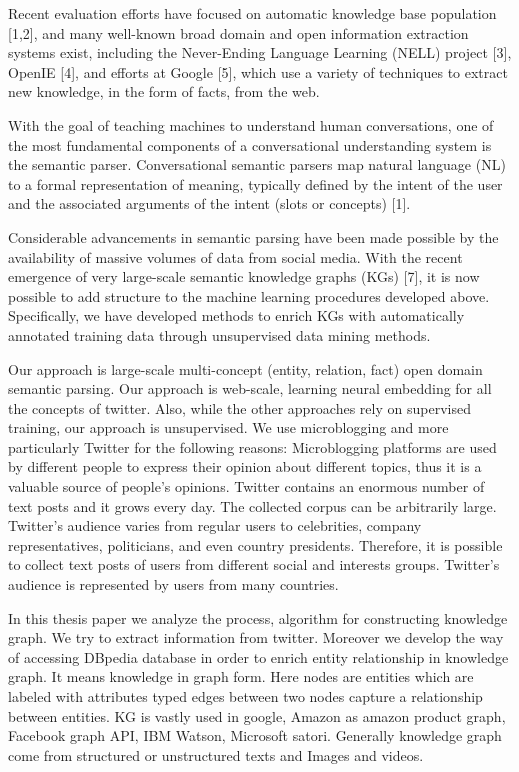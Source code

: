  Recent evaluation efforts have focused on automatic knowledge base population [1,2], and many well-known broad domain and open information extraction systems exist, including the Never-Ending Language Learning (NELL) project [3], OpenIE [4], and efforts at Google [5], which use a variety of techniques to extract new knowledge, in the form of facts, from the web. 

With the goal of teaching machines to understand human conversations, one of the most fundamental components of a conversational understanding system is the semantic parser. Conversational semantic parsers map natural language (NL) to a formal representation of meaning, typically defined by the intent of the user and the associated arguments of the intent (slots or concepts) [1].


Considerable advancements in semantic parsing have been made possible by the availability of massive volumes of data from social media.
With the recent emergence of very large-scale semantic knowledge graphs (KGs) [7], it is now possible to add structure to the machine learning procedures developed above. Specifically, we have developed methods to enrich KGs with automatically annotated training data through unsupervised data mining methods. 


Our approach is large-scale multi-concept (entity, relation, fact) open domain semantic parsing. Our approach is web-scale, learning neural embedding for all the concepts of twitter. Also, while the other approaches rely on supervised training, our approach is unsupervised.  
We use microblogging and more particularly Twitter for the following reasons:
 Microblogging platforms are used by different people to express their opinion about different topics, thus it is a valuable source of people’s opinions.  Twitter contains an enormous number of text posts and it grows every day. The collected corpus can be arbitrarily large.  Twitter’s audience varies from regular users to celebrities, company representatives, politicians, and even country presidents. Therefore, it is possible to collect text posts of users from different social and interests groups.  Twitter’s audience is represented by users from many countries. 


 In this thesis paper we analyze the process, algorithm for constructing knowledge graph. We try to extract information from twitter. Moreover we develop the way of accessing DBpedia database in order to enrich entity relationship in knowledge graph. It means knowledge in graph form. Here nodes are entities which are labeled with attributes typed edges between two nodes capture a relationship between entities. KG is vastly used in google, Amazon as amazon product graph, Facebook graph API, IBM Watson, Microsoft satori.  Generally knowledge graph come from structured or unstructured texts and Images and videos. 


